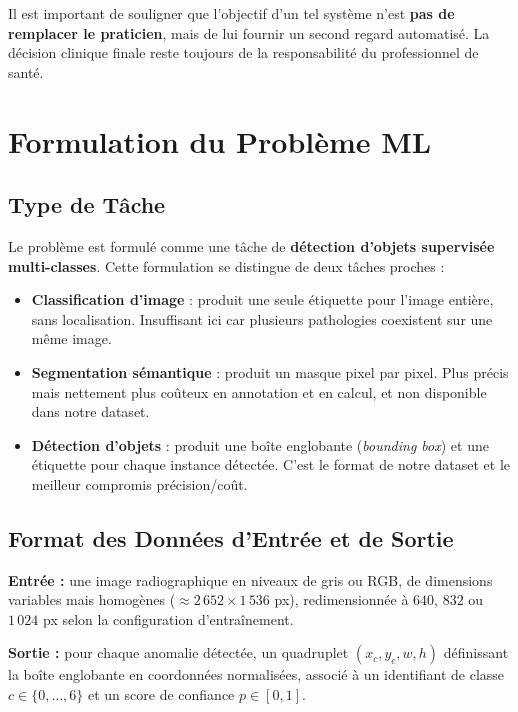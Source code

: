 \documentclass{rapportENSIAS}
\begin{document}
Il est important de souligner que l'objectif d'un tel système n'est \textbf{pas de remplacer le praticien}, mais de lui fournir un second regard automatisé. La décision clinique finale reste toujours de la responsabilité du professionnel de santé.

\section{Formulation du Problème ML}

\subsection{Type de Tâche}

Le problème est formulé comme une tâche de \textbf{détection d'objets supervisée multi-classes}. Cette formulation se distingue de deux tâches proches :

\begin{itemize}
    \item \textbf{Classification d'image} : produit une seule étiquette pour l'image entière, sans localisation. Insuffisant ici car plusieurs pathologies coexistent sur une même image.
    \item \textbf{Segmentation sémantique} : produit un masque pixel par pixel. Plus précis mais nettement plus coûteux en annotation et en calcul, et non disponible dans notre dataset.
    \item \textbf{Détection d'objets} : produit une boîte englobante (\textit{bounding box}) et une étiquette pour chaque instance détectée. C'est le format de notre dataset et le meilleur compromis précision/coût.
\end{itemize}

\subsection{Format des Données d'Entrée et de Sortie}

\textbf{Entrée :} une image radiographique en niveaux de gris ou RGB, de dimensions variables mais homogènes ($\approx 2\,652 \times 1\,536$ px), redimensionnée à $640$, $832$ ou $1\,024$ px selon la configuration d'entraînement.

\textbf{Sortie :} pour chaque anomalie détectée, un quadruplet $(x_c, y_c, w, h)$ définissant la boîte englobante en coordonnées normalisées, associé à un identifiant de classe $c \in \{0, \ldots, 6\}$ et un score de confiance $p \in [0, 1]$.
\end{document}
